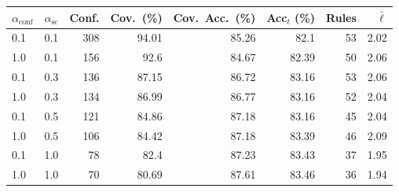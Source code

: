 \begin{tabular}{llrrrrrr}
\toprule
$\alpha_{\mathrm{conf}}$ & $\alpha_{\mathrm{sc}}$ & Conf. & Cov.\ (\%) & Cov.\ Acc.\ (\%) & Acc$_t$ (\%) & Rules & $\bar{\ell}$ \\
\midrule
0.1 & 0.1 & 308 & 94.01 & 85.26 & 82.1 & 53 & 2.02 \\
1.0 & 0.1 & 156 & 92.6 & 84.67 & 82.39 & 50 & 2.06 \\
\midrule
0.1 & 0.3 & 136 & 87.15 & 86.72 & 83.16 & 53 & 2.06 \\
1.0 & 0.3 & 134 & 86.99 & 86.77 & 83.16 & 52 & 2.04 \\
\midrule
0.1 & 0.5 & 121 & 84.86 & 87.18 & 83.16 & 45 & 2.04 \\
1.0 & 0.5 & 106 & 84.42 & 87.18 & 83.39 & 46 & 2.09 \\
\midrule
0.1 & 1.0 & 78 & 82.4 & 87.23 & 83.43 & 37 & 1.95 \\
1.0 & 1.0 & 70 & 80.69 & 87.61 & 83.46 & 36 & 1.94 \\
\bottomrule
\end{tabular}
